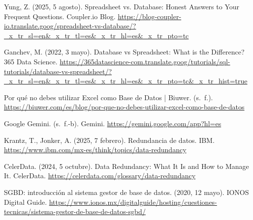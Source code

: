 \documentclass[12pt]{report}
\begin{document}
\begin{thebibliography}{99}
    Yung, Z. (2025, 5 agosto). Spreadsheet vs. Database: Honest Answers to Your Frequent Questions. Coupler.io Blog. \url{https://blog-coupler-io.translate.goog/spreadsheet-vs-database/?_x_tr_sl=en&_x_tr_tl=es&_x_tr_hl=es&_x_tr_pto=tc}

    Ganchev, M. (2022, 3 mayo). Database vs Spreadsheet: What is the Difference? 365 Data Science. \url{https://365datascience-com.translate.goog/tutorials/sql-tutorials/database-vs-spreadsheet/?_x_tr_sl=en&_x_tr_tl=es&_x_tr_hl=es&_x_tr_pto=tc&_x_tr_hist=true}

    Por qué no debes utilizar Excel como Base de Datos | Biuwer. (s. f.). \url{https://biuwer.com/es/blog/por-que-no-debes-utilizar-excel-como-base-de-datos}

    Google Gemini. (s. f.-b). Gemini. \url{https://gemini.google.com/app?hl=es}

    Krantz, T., Jonker, A. (2025, 7 febrero). Redundancia de datos. IBM. \url{https://www.ibm.com/mx-es/think/topics/data-redundancy}

    CelerData. (2024, 5 octubre). Data Redundancy: What It Is and How to Manage It. CelerData. \url{https://celerdata.com/glossary/data-redundancy}

    SGBD: introducción al sistema gestor de base de datos. (2020, 12 mayo). IONOS Digital Guide. \url{https://www.ionos.mx/digitalguide/hosting/cuestiones-tecnicas/sistema-gestor-de-base-de-datos-sgbd/}
\end{thebibliography}
\end{document}
